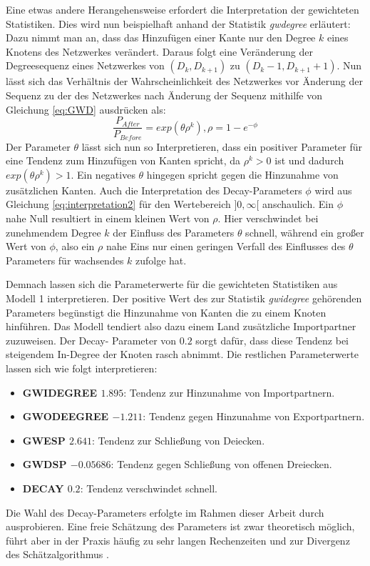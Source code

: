 \documentclass[a4paper,ngerman,oneside,titlepage,bibliography=totoc,11pt]{scrreprt}
\begin{document}
Eine etwas andere Herangehensweise erfordert die Interpretation der gewichteten Statistiken. Dies wird nun beispielhaft anhand der Statistik \emph{gwdegree} erläutert:
Dazu nimmt man an, dass das Hinzufügen einer Kante nur den Degree $k$ eines Knotens des Netzwerkes verändert. Daraus folgt eine Veränderung der Degreesequenz eines Netzwerkes von $(D_k, D_{k+1})$ zu $(D_k-1, D_{k+1}+1)$. Nun lässt sich das Verhältnis der Wahrscheinlichkeit des Netzwerkes vor Änderung der Sequenz zu der des Netzwerkes nach Änderung der Sequenz mithilfe von Gleichung \ref{eq:GWD} ausdrücken als:
\begin{equation}
\frac{P_{After}}{P_{Before}} = exp(\theta\rho^k) , \rho = 1 - e^{-\phi}
\label{eq:interpretation2}
\end{equation}
Der Parameter $\theta$ lässt sich nun so Interpretieren, dass ein positiver Parameter für eine Tendenz zum Hinzufügen von Kanten spricht, da $\rho^k>0$ ist und dadurch $exp(\theta\rho^k)>1$. Ein negatives $\theta$ hingegen spricht gegen die Hinzunahme von zusätzlichen Kanten.
Auch die Interpretation des Decay-Parameters $\phi$ wird aus Gleichung \ref{eq:interpretation2} für den Wertebereich $]0,\infty[$ anschaulich. Ein $\phi$ nahe Null resultiert in einem kleinen Wert von $\rho$. Hier verschwindet bei zunehmendem Degree $k$ der Einfluss des Parameters $\theta$ schnell, während ein großer Wert von $\phi$, also ein $\rho$ nahe Eins nur einen geringen Verfall des Einflusses des $\theta$ Parameters für wachsendes $k$ zufolge hat.

Demnach lassen sich die Parameterwerte für die gewichteten Statistiken aus Modell 1 interpretieren. Der positive Wert des zur Statistik \emph{gwidegree} gehörenden Parameters begünstigt die Hinzunahme von Kanten die zu einem Knoten hinführen. Das Modell tendiert also dazu einem Land zusätzliche Importpartner zuzuweisen. Der Decay- Parameter von $0.2$ sorgt dafür, dass diese Tendenz bei steigendem In-Degree der Knoten rasch abnimmt. Die restlichen Parameterwerte lassen sich wie folgt interpretieren: 
	\begin{itemize}
		\item {\textbf{GWIDEGREE $1.895$}: Tendenz zur Hinzunahme von Importpartnern.}
		\item {\textbf{GWODEEGREE $-1.211$}: Tendenz gegen Hinzunahme von Exportpartnern.}
		\item {\textbf{GWESP $2.641$}: Tendenz zur Schließung von Deiecken.}
		\item {\textbf{GWDSP $-0.05686$}: Tendenz gegen Schließung von offenen Dreiecken.}\\\vspace{1cm}
		\item {\textbf{DECAY $0.2$}: Tendenz verschwindet schnell.}
	\end{itemize}
	Die Wahl des Decay-Parameters erfolgte im Rahmen dieser Arbeit durch ausprobieren. Eine freie Schätzung des Parameters ist zwar theoretisch möglich, führt aber in der Praxis häufig zu sehr langen Rechenzeiten und zur Divergenz des Schätzalgorithmus \citep{goodreau2008statnet}.
	
\end{document}
